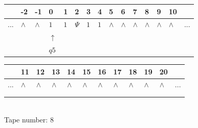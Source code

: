 \documentclass[11pt]{article}
\begin{document}
\begin{table}[H]
\centering
\begin{tabular}{lllllllllllllll}
 & -2 & -1 & 0 & 1 & 2 & 3 & 4 & 5 & 6 & 7 & 8 & 9 & 10 & \\
\hline
$...$ & \multicolumn{1}{|l|}{$\wedge$} & \multicolumn{1}{|l|}{$\wedge$} & \multicolumn{1}{|l|}{$1$} & \multicolumn{1}{|l|}{$1$} & \multicolumn{1}{|l|}{$\Psi$} & \multicolumn{1}{|l|}{$1$} & \multicolumn{1}{|l|}{$1$} & \multicolumn{1}{|l|}{$\wedge$} & \multicolumn{1}{|l|}{$\wedge$} & \multicolumn{1}{|l|}{$\wedge$} & \multicolumn{1}{|l|}{$\wedge$} & \multicolumn{1}{|l|}{$\wedge$} & \multicolumn{1}{|l|}{$\wedge$} & $...$\\
\hline
&  &  & $\uparrow$ &  &  &  &  &  &  &  &  &  &  &  \\
&  &  & $ q5 $ &  &  &  &  &  &  &  &  &  &  &  \\
\end{tabular}
\begin{tabular}{llllllllllll}
 & 11 & 12 & 13 & 14 & 15 & 16 & 17 & 18 & 19 & 20 & \\
\hline
$...$ & \multicolumn{1}{|l|}{$\wedge$} & \multicolumn{1}{|l|}{$\wedge$} & \multicolumn{1}{|l|}{$\wedge$} & \multicolumn{1}{|l|}{$\wedge$} & \multicolumn{1}{|l|}{$\wedge$} & \multicolumn{1}{|l|}{$\wedge$} & \multicolumn{1}{|l|}{$\wedge$} & \multicolumn{1}{|l|}{$\wedge$} & \multicolumn{1}{|l|}{$\wedge$} & \multicolumn{1}{|l|}{$\wedge$} & $...$\\
\hline
&  &  &  &  &  &  &  &  &  &  &  \\
&  &  &  &  &  &  &  &  &  &  &  \\
\end{tabular}
\\
Tape number: 8
\noindent\makebox[\linewidth]{\hdashrule{\textwidth}{1pt}{1pt}}\end{table}
\end{document}
